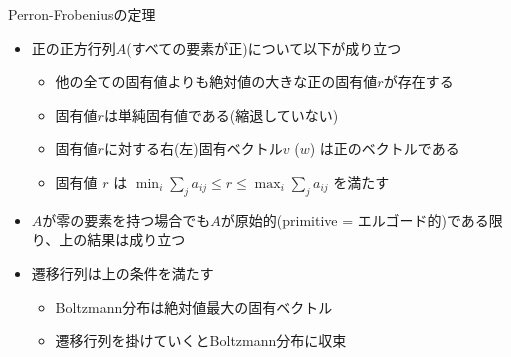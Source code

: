 \begin{frame}[t,fragile]{Perron-Frobeniusの定理}
  \begin{itemize}
  \item 正の正方行列$A$(すべての要素が正)について以下が成り立つ
    \begin{itemize}
      \item 他の全ての固有値よりも絶対値の大きな正の固有値$r$が存在する
      \item 固有値$r$は単純固有値である(縮退していない)
      \item 固有値$r$に対する右(左)固有ベクトル$v$ ($w$) は正のベクトルである
      \item 固有値 $r$ は $\displaystyle \min_i \sum_j a_{ij} \le r \le \max_i \sum_j a_{ij}$ を満たす
    \end{itemize}
  \item $A$が零の要素を持つ場合でも$A$が原始的(primitive = エルゴード的)である限り、上の結果は成り立つ
  \item 遷移行列は上の条件を満たす
    \begin{itemize}
    \item Boltzmann分布は絶対値最大の固有ベクトル
    \item 遷移行列を掛けていくとBoltzmann分布に収束
    \end{itemize}
  \end{itemize}
\end{frame}
